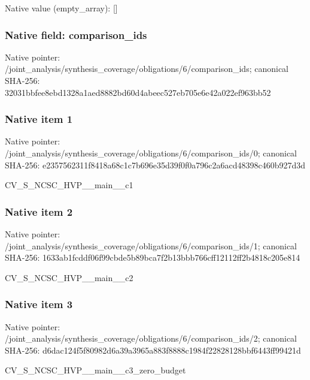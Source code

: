 \documentclass[10pt,a4paper]{article}
\begin{document}
Native value (empty\_\allowbreak{}array): []

\subsubsection{Native field: comparison\_\allowbreak{}ids}
Native pointer: /joint\_\allowbreak{}analysis/synthesis\_\allowbreak{}coverage/obligations/6/comparison\_\allowbreak{}ids; canonical SHA-256: 32031bbfee8ebd1328a1aed8882bd60d4abeec527eb705e6e42a022ef963bb52

\subsubsection{Native item 1}
Native pointer: /joint\_\allowbreak{}analysis/synthesis\_\allowbreak{}coverage/obligations/6/comparison\_\allowbreak{}ids/0; canonical SHA-256: e2357562311f8418a68c1c7b696e35d39f0f0a796c2a6acd48398c460b927d3d

\begingroup\raggedright\sloppy CV\_\allowbreak{}S\_\allowbreak{}NCSC\_\allowbreak{}HVP\_\allowbreak{}\_\allowbreak{}main\_\allowbreak{}\_\allowbreak{}c1\par\endgroup

\subsubsection{Native item 2}
Native pointer: /joint\_\allowbreak{}analysis/synthesis\_\allowbreak{}coverage/obligations/6/comparison\_\allowbreak{}ids/1; canonical SHA-256: 1633ab1fcddf06f99cbde5b89bca7f2b13bbb766cff12112ff2b4818c205e814

\begingroup\raggedright\sloppy CV\_\allowbreak{}S\_\allowbreak{}NCSC\_\allowbreak{}HVP\_\allowbreak{}\_\allowbreak{}main\_\allowbreak{}\_\allowbreak{}c2\par\endgroup

\subsubsection{Native item 3}
Native pointer: /joint\_\allowbreak{}analysis/synthesis\_\allowbreak{}coverage/obligations/6/comparison\_\allowbreak{}ids/2; canonical SHA-256: d6dac124f5f80982d6a39a3965a883f8888c1984f22828128bbf6443ff99421d

\begingroup\raggedright\sloppy CV\_\allowbreak{}S\_\allowbreak{}NCSC\_\allowbreak{}HVP\_\allowbreak{}\_\allowbreak{}main\_\allowbreak{}\_\allowbreak{}c3\_\allowbreak{}zero\_\allowbreak{}budget\par\endgroup
\end{document}
